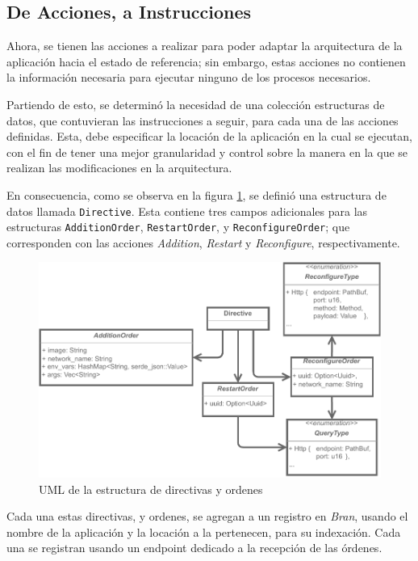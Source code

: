 \subsection{De Acciones, a Instrucciones}

Ahora, se tienen las acciones a realizar para poder adaptar la arquitectura de la aplicación hacia el estado de referencia; sin embargo, estas acciones no contienen la información necesaria para ejecutar ninguno de los procesos necesarios.

Partiendo de esto, se determinó la necesidad de una colección estructuras de datos, que contuvieran las instrucciones a seguir, para cada una de las acciones definidas. Esta, debe especificar la locación de la aplicación en la cual se ejecutan, con el fin de tener una mejor granularidad y control sobre la manera en la que se realizan las modificaciones en la arquitectura.

En consecuencia, como se observa en la figura \ref{fig:Directives}, se definió una estructura de datos llamada \texttt{Directive}. Esta contiene tres campos adicionales para las estructuras \texttt{AdditionOrder}, \texttt{RestartOrder}, y \texttt{ReconfigureOrder}; que corresponden con las acciones \textit{Addition}, \textit{Restart} y \textit{Reconfigure}, respectivamente.

\begin{figure}[ht]
    \centering
    \caption{UML de la estructura de directivas y ordenes}
    \label{fig:Directives}
    \includegraphics[width=0.8\linewidth]{images/Directives.pdf}
\end{figure}

Cada una estas directivas, y ordenes, se agregan a un registro en \textit{Bran}, usando el nombre de la aplicación y la locación a la pertenecen, para su indexación. Cada una se registran usando un endpoint dedicado a la recepción de las órdenes.

